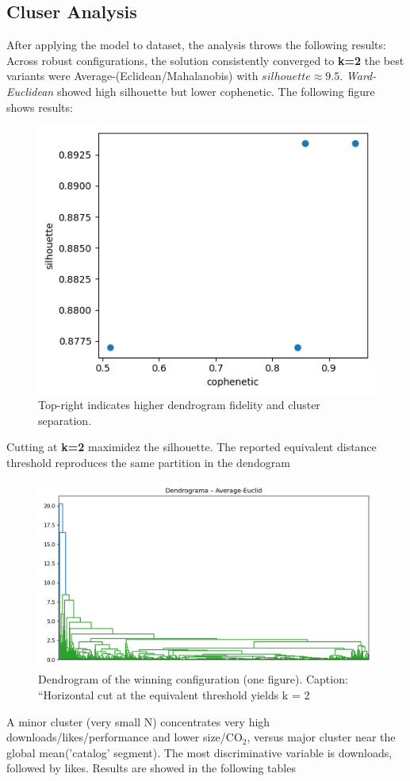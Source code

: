\documentclass[journal]{IEEEtran}
\begin{document}
	\subsection{Cluser Analysis}
	After applying the model to dataset, the analysis throws the following results:
	Across robust configurations, the solution consistently converged to \textbf{k=2} the best variants were Average-(Eclidean/Mahalanobis)  with $ silhouette \approx 9.5$. \textit{Ward-Euclidean} showed high silhouette but lower cophenetic.
	The following figure shows results:
		\begin{figure}[H]
		\centering
		\includegraphics[width=0.8\columnwidth]{assets/1_coph_vs_silhouette.png}
		\caption{Top-right indicates higher dendrogram fidelity and cluster separation.}
		\label{fig:coph_vs_silhouette}
	\end{figure}
	Cutting at \textbf{k=2} maximidez the silhouette. The reported equivalent distance threshold reproduces the same partition in the dendogram 
	\begin{figure}[H]
		\centering
		\includegraphics[width=0.8\columnwidth]{assets/2_dendogram_avg_euc.png}
		\caption{Dendrogram of the winning configuration (one figure).
			Caption: “Horizontal cut at the equivalent threshold yields k = 2}
		\label{fig:dendogram_avg_eucl}
	\end{figure}
	A minor cluster (very small N) concentrates very high downloads/likes/performance and lower size/$\text{CO}_2$, versus major cluster near the global mean('catalog' segment). The most discriminative variable is downloads, followed by likes.
	Results are showed in the following tables
	
\end{document}
